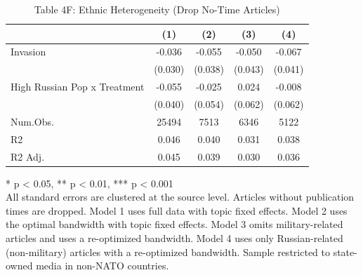 \begin{table}[!t]
\caption{Table 4F: Ethnic Heterogeneity (Drop No-Time Articles)} 
\fontsize{12.0pt}{14.4pt}\selectfont
\begin{tabular*}{\linewidth}{@{\extracolsep{\fill}}lcccc}
\toprule
  & (1) & (2) & (3) & (4) \\ 
\midrule\addlinespace[2.5pt]
Invasion & -0.036 & -0.055 & -0.050 & -0.067 \\ 
 & (0.030) & (0.038) & (0.043) & (0.041) \\ 
High Russian Pop x Treatment & -0.055 & -0.025 & 0.024 & -0.008 \\ 
{} & {(0.040)} & {(0.054)} & {(0.062)} & {(0.062)} \\ 
Num.Obs. & 25494 & 7513 & 6346 & 5122 \\ 
R2 & 0.046 & 0.040 & 0.031 & 0.038 \\ 
R2 Adj. & 0.045 & 0.039 & 0.030 & 0.036 \\ 
\bottomrule
\end{tabular*}
\begin{minipage}{\linewidth}
* p < 0.05, ** p < 0.01, *** p < 0.001\\
All standard errors are clustered at the source level. Articles without
publication times are dropped. Model 1 uses full data with topic fixed effects.
Model 2 uses the optimal bandwidth with topic fixed effects. Model 3 omits
military-related articles and uses a re-optimized bandwidth. Model 4 uses only
Russian-related (non-military) articles with a re-optimized bandwidth. Sample
restricted to state-owned media in non-NATO countries.\\
\end{minipage}
\end{table}

